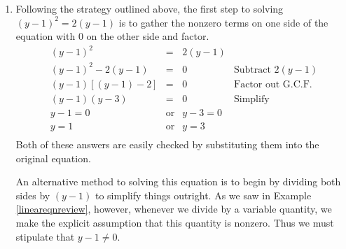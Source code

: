 \documentclass{ximera}
\begin{document}
\begin{example}
\begin{explanation}
\begin{enumerate}
\[\begin{array}{rclr}
t & = & \frac{1+4t^2}{4} & \\

4t & = & 1+4t^2 & \text{Clear fractions (multiply by $4$)} \\

0 & = & 1+4t^2 - 4t & \text{Subtract 4} \\

0 & = & 4t^2 - 4t + 1 & \text{Rearrange terms} \\

0 & = & (2t-1)^2 & \text{Factor (Perfect Square Trinomial)} \\

\end{array} \]

At this point, we get $(2t-1)^2 = (2t-1)(2t-1) = 0$, so, the Zero Product Property gives us $2t-1 =0$ in both cases.\footnote{More generally, given a positive power $p$,  the only solution to $x^p = 0$ is $x = 0$.}  Our final answer is $t = \frac{1}{2}$, which we invite the reader to check.

\item  Following the strategy outlined above, the first step to solving $(y-1)^2 = 2(y-1)$ is to gather the nonzero terms on one side of the equation with $0$ on the other side and factor.\[ \begin{array}{rclr}

(y-1)^2 & = & 2(y-1) & \\

(y-1)^2 - 2(y-1) & = & 0 & \text{Subtract $2(y-1)$} \\
(y-1)[(y-1) - 2] & = & 0 & \text{Factor out G.C.F.} \\
(y-1)(y-3) & = & 0 &  \text{Simplify} \\
y-1 = 0 & \text{or} & y - 3 = 0 & \\

y = 1 & \text{or} & y = 3 & \\  \end{array} \] Both of these answers are easily checked by substituting them into the original equation.  

 

An alternative method to solving this equation is to begin by dividing both sides by $(y-1)$ to simplify things outright.  As we saw in Example \ref{lineareqnreview}, however, whenever we divide by a variable quantity, we make the explicit assumption that this quantity is nonzero.  Thus we must stipulate that $y - 1 \neq 0$.\[ \begin{array}{rclr}


\end{array}\]
\end{enumerate}
\end{explanation}
\end{example}
\end{document}

